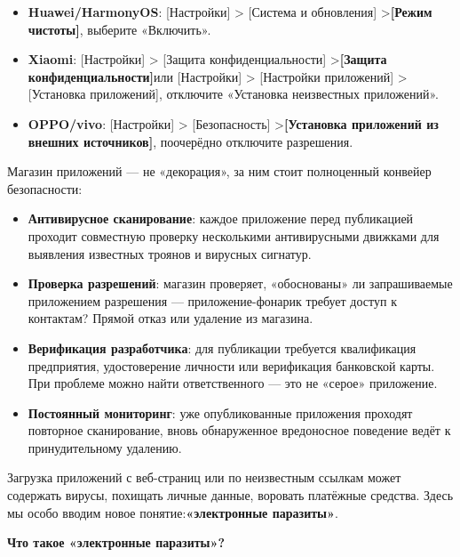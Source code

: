 
\begin{itemize}
  \item \textbf{Huawei/HarmonyOS}: [Настройки] > [Система и обновления] >\textbf{[Режим чистоты]}, выберите «Включить».
  \item \textbf{Xiaomi}: [Настройки] > [Защита конфиденциальности] >\textbf{[Защита конфиденциальности]}или [Настройки] > [Настройки приложений] > [Установка приложений], отключите «Установка неизвестных приложений».
  \item \textbf{OPPO/vivo}: [Настройки] > [Безопасность] >\textbf{[Установка приложений из внешних источников]}, поочерёдно отключите разрешения.
\end{itemize}


Магазин приложений — не «декорация», за ним стоит полноценный конвейер безопасности:

\begin{itemize}
  \item \textbf{Антивирусное сканирование}: каждое приложение перед публикацией проходит совместную проверку несколькими антивирусными движками для выявления известных троянов и вирусных сигнатур.
  \item \textbf{Проверка разрешений}: магазин проверяет, «обоснованы» ли запрашиваемые приложением разрешения — приложение-фонарик требует доступ к контактам? Прямой отказ или удаление из магазина.
  \item \textbf{Верификация разработчика}: для публикации требуется квалификация предприятия, удостоверение личности или верификация банковской карты. При проблеме можно найти ответственного — это не «серое» приложение.
  \item \textbf{Постоянный мониторинг}: уже опубликованные приложения проходят повторное сканирование, вновь обнаруженное вредоносное поведение ведёт к принудительному удалению.
\end{itemize}


Загрузка приложений с веб-страниц или по неизвестным ссылкам может содержать вирусы, похищать личные данные, воровать платёжные средства. Здесь мы особо вводим новое понятие:\textbf{«электронные паразиты»}.

\textbf{Что такое «электронные паразиты»?}\par

